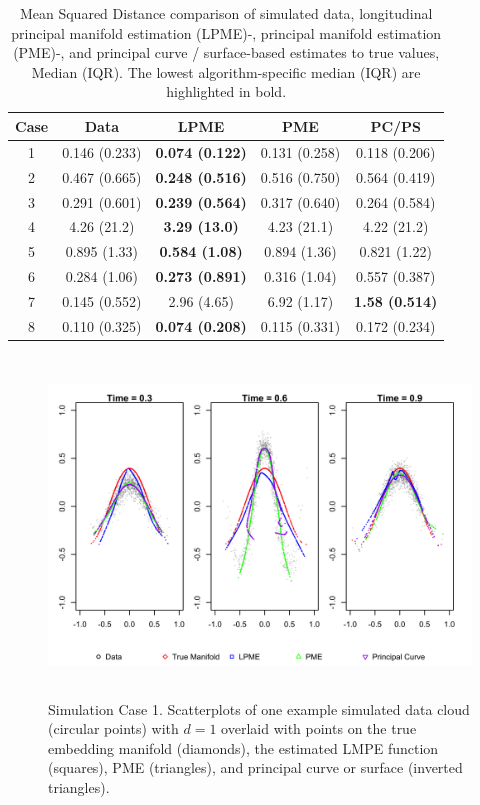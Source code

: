 \documentclass[12pt]{article}
\theoremstyle{definition}
\begin{document}
\begin{table}[h]
  \centering
  \begin{tabular}{|c c c c c|}
    \hline
    Case & Data & LPME & PME & PC/PS \\
    \hline
    1 & 0.146 (0.233) & {\bf 0.074 (0.122)} & 0.131 (0.258) & 0.118 (0.206) \\
    2 & 0.467 (0.665) & {\bf 0.248 (0.516)} & 0.516 (0.750) & 0.564 (0.419) \\
    3 & 0.291 (0.601) & {\bf 0.239 (0.564)} & 0.317 (0.640) & 0.264 (0.584) \\
    4 & 4.26 (21.2) & {\bf 3.29 (13.0)} & 4.23 (21.1) & 4.22 (21.2) \\
    5 & 0.895 (1.33) & {\bf 0.584 (1.08)} & 0.894 (1.36) & 0.821 (1.22) \\
    6 & 0.284 (1.06) & {\bf 0.273 (0.891)} & 0.316 (1.04) & 0.557 (0.387) \\
    7 & 0.145 (0.552) & 2.96 (4.65) & 6.92 (1.17) & {\bf 1.58 (0.514)} \\
    8 & 0.110 (0.325) & {\bf 0.074 (0.208)} & 0.115 (0.331) & 0.172 (0.234) \\
    \hline
  \end{tabular}
  \caption{{\footnotesize Mean Squared Distance comparison of simulated data, longitudinal principal manifold estimation (LPME)-, principal manifold estimation (PME)-, and principal curve / surface-based estimates to true values, Median (IQR). The lowest algorithm-specific median (IQR) are highlighted in bold.}}
  \label{table:simulation_results_median}
\end{table}

\begin{figure}
  \centering
  \includegraphics[height=9cm]{sim_case1}
  \caption{{\footnotesize Simulation Case 1. Scatterplots of one example simulated data cloud (circular points) with $d=1$ overlaid with points on the true embedding manifold (diamonds), the estimated LMPE function (squares), PME (triangles), and principal curve or surface (inverted triangles). }}
  \label{fig:sim_case1}
\end{figure}
\end{document}
